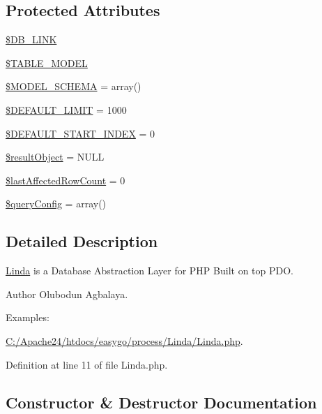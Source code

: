 \subsection*{Protected Attributes}
\begin{DoxyCompactItemize}
\item 
\hyperlink{class_linda_a11c2781ac527a1c951d9035f2d0197cc}{\$\+D\+B\+\_\+\+L\+I\+N\+K}
\item 
\hyperlink{class_linda_a486c281995ea6cdb9fb0367b6e260b76}{\$\+T\+A\+B\+L\+E\+\_\+\+M\+O\+D\+E\+L}
\item 
\hyperlink{class_linda_a46c628c6bd56ec5880da2515cf352183}{\$\+M\+O\+D\+E\+L\+\_\+\+S\+C\+H\+E\+M\+A} = array()
\item 
\hyperlink{class_linda_a97365f1875db5efbdefc5faa71249ff1}{\$\+D\+E\+F\+A\+U\+L\+T\+\_\+\+L\+I\+M\+I\+T} = 1000
\item 
\hyperlink{class_linda_a803cce07cc3e3f9937b6e5faba4100fe}{\$\+D\+E\+F\+A\+U\+L\+T\+\_\+\+S\+T\+A\+R\+T\+\_\+\+I\+N\+D\+E\+X} = 0
\item 
\hyperlink{class_linda_a64270a514fbca17fe7347df6320fc4ba}{\$result\+Object} = N\+U\+L\+L
\item 
\hyperlink{class_linda_a038edab690e03aff9c70a1f63c06f27e}{\$last\+Affected\+Row\+Count} = 0
\item 
\hyperlink{class_linda_aea7d038e46660f55592569906cf09494}{\$query\+Config} = array()
\end{DoxyCompactItemize}


\subsection{Detailed Description}
\hyperlink{class_linda}{Linda} is a Database Abstraction Layer for P\+H\+P Built on top P\+D\+O. 

\begin{DoxyAuthor}{Author}
Olubodun Agbalaya. 
\end{DoxyAuthor}
\begin{Desc}
\item[Examples\+: ]\par
\hyperlink{_c_1_2_apache24_2htdocs_2easygo_2process_2_linda_2_linda_8php-example}{C\+:/\+Apache24/htdocs/easygo/process/\+Linda/\+Linda.\+php}.\end{Desc}


Definition at line 11 of file Linda.\+php.



\subsection{Constructor \& Destructor Documentation}
\hypertarget{class_linda_a095c5d389db211932136b53f25f39685}{}
